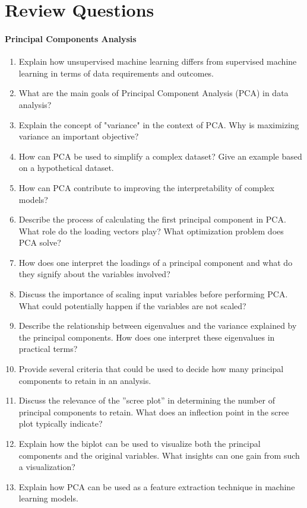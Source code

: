 \section{Review Questions}

\paragraph*{Principal Components Analysis}

\begin{enumerate}[nosep]
    \item Explain how unsupervised machine learning differs from supervised machine learning in terms of data requirements and outcomes.
    \item What are the main goals of Principal Component Analysis (PCA) in data analysis?
    \item Explain the concept of "variance" in the context of PCA. Why is maximizing variance an important objective?
    \item How can PCA be used to simplify a complex dataset? Give an example based on a hypothetical dataset.
    \item How can PCA contribute to improving the interpretability of complex models?
    \item Describe the process of calculating the first principal component in PCA. What role do the loading vectors play? What optimization problem does PCA solve?
    \item How does one interpret the loadings of a principal component and what do they signify about the variables involved?
    \item Discuss the importance of scaling input variables before performing PCA. What could potentially happen if the variables are not scaled?
    \item Describe the relationship between eigenvalues and the variance explained by the principal components. How does one interpret these eigenvalues in practical terms?
    \item Provide several criteria that could be used to decide how many principal components to retain in an analysis.
    \item Discuss the relevance of the ''scree plot'' in determining the number of principal components to retain. What does an inflection point in the scree plot typically indicate?
    \item Explain how the biplot can be used to visualize both the principal components and the original variables. What insights can one gain from such a visualization?
    \item Explain how PCA can be used as a feature extraction technique in machine learning models.
\end{enumerate}
